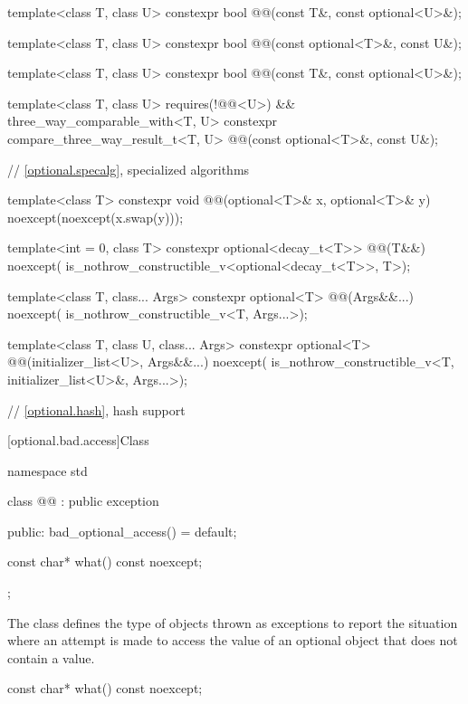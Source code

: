 \begin{codeblock}
{  template<class T, class U> constexpr bool @@(const T&, const optional<U>&);

  template<class T, class U> constexpr bool @@(const optional<T>&, const U&);

  template<class T, class U> constexpr bool @@(const T&, const optional<U>&);

  template<class T, class U>
    requires(!@@<U>) && three_way_comparable_with<T, U>
  constexpr compare_three_way_result_t<T, U> @@(const optional<T>&, const U&);

  // \ref{optional.specalg}, specialized algorithms

  template<class T>
  constexpr void @@(optional<T>& x, optional<T>& y) noexcept(noexcept(x.swap(y)));

  template<int = 0, class T>
  constexpr optional<decay_t<T>> @@(T&&) noexcept(
      is_nothrow_constructible_v<optional<decay_t<T>>, T>);

  template<class T, class... Args>
  constexpr optional<T> @@(Args&&...) noexcept(
      is_nothrow_constructible_v<T, Args...>);

  template<class T, class U, class... Args>
  constexpr optional<T> @@(initializer_list<U>, Args&&...) noexcept(
      is_nothrow_constructible_v<T, initializer_list<U>&, Args...>);

  // \ref{optional.hash}, hash support
}
\end{codeblock}

[optional.bad.access]{Class }

\begin{codeblock}
namespace std {
  class @@ : public exception {
  public:
    bad_optional_access() = default;

    const char* what() const noexcept;
  };
}
\end{codeblock}

\pnum
The class  defines the type of objects thrown as exceptions to report the situation where an attempt is made to access the value of an optional object that does not contain a value.

%
\begin{itemdecl}
const char* what() const noexcept;
\end{itemdecl}

